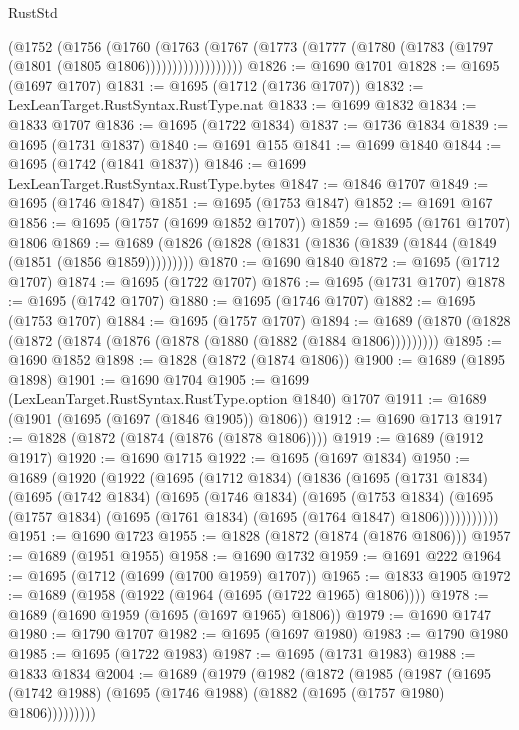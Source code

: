 \begin{lexlean}{RustStd}
\begin{coremodule}
{\begin{coremodule}
{{{{{{{{{{{{{{{{                (@1752
                  (@1756
                    (@1760
                      (@1763
                        (@1767
                          (@1773 (@1777 (@1780 (@1783 (@1797 (@1801 (@1805 @1806))))))))))))))))))
@1826 := @1690 @1701
@1828 := @1695 (@1697 @1707)
@1831 := @1695 (@1712 (@1736 @1707))
@1832 := LexLeanTarget.RustSyntax.RustType.nat
@1833 := @1699 @1832
@1834 := @1833 @1707
@1836 := @1695 (@1722 @1834)
@1837 := @1736 @1834
@1839 := @1695 (@1731 @1837)
@1840 := @1691 @155
@1841 := @1699 @1840
@1844 := @1695 (@1742 (@1841 @1837))
@1846 := @1699 LexLeanTarget.RustSyntax.RustType.bytes
@1847 := @1846 @1707
@1849 := @1695 (@1746 @1847)
@1851 := @1695 (@1753 @1847)
@1852 := @1691 @167
@1856 := @1695 (@1757 (@1699 @1852 @1707))
@1859 := @1695 (@1761 @1707) @1806
@1869 := @1689 (@1826 (@1828 (@1831 (@1836 (@1839 (@1844 (@1849 (@1851 (@1856 @1859)))))))))
@1870 := @1690 @1840
@1872 := @1695 (@1712 @1707)
@1874 := @1695 (@1722 @1707)
@1876 := @1695 (@1731 @1707)
@1878 := @1695 (@1742 @1707)
@1880 := @1695 (@1746 @1707)
@1882 := @1695 (@1753 @1707)
@1884 := @1695 (@1757 @1707)
@1894 := @1689 (@1870 (@1828 (@1872 (@1874 (@1876 (@1878 (@1880 (@1882 (@1884 @1806)))))))))
@1895 := @1690 @1852
@1898 := @1828 (@1872 (@1874 @1806))
@1900 := @1689 (@1895 @1898)
@1901 := @1690 @1704
@1905 := @1699 (LexLeanTarget.RustSyntax.RustType.option @1840) @1707
@1911 := @1689 (@1901 (@1695 (@1697 (@1846 @1905)) @1806))
@1912 := @1690 @1713
@1917 := @1828 (@1872 (@1874 (@1876 (@1878 @1806))))
@1919 := @1689 (@1912 @1917)
@1920 := @1690 @1715
@1922 := @1695 (@1697 @1834)
@1950 := @1689
    (@1920
      (@1922
        (@1695
          (@1712 @1834)
          (@1836
            (@1695
              (@1731 @1834)
              (@1695
                (@1742 @1834)
                (@1695
                  (@1746 @1834)
                  (@1695
                    (@1753 @1834)
                    (@1695 (@1757 @1834) (@1695 (@1761 @1834) (@1695 (@1764 @1847) @1806)))))))))))
@1951 := @1690 @1723
@1955 := @1828 (@1872 (@1874 (@1876 @1806)))
@1957 := @1689 (@1951 @1955)
@1958 := @1690 @1732
@1959 := @1691 @222
@1964 := @1695 (@1712 (@1699 (@1700 @1959) @1707))
@1965 := @1833 @1905
@1972 := @1689 (@1958 (@1922 (@1964 (@1695 (@1722 @1965) @1806))))
@1978 := @1689 (@1690 @1959 (@1695 (@1697 @1965) @1806))
@1979 := @1690 @1747
@1980 := @1790 @1707
@1982 := @1695 (@1697 @1980)
@1983 := @1790 @1980
@1985 := @1695 (@1722 @1983)
@1987 := @1695 (@1731 @1983)
@1988 := @1833 @1834
@2004 := @1689
    (@1979
      (@1982
        (@1872
          (@1985
            (@1987
              (@1695 (@1742 @1988) (@1695 (@1746 @1988) (@1882 (@1695 (@1757 @1980) @1806)))))))))
}}}}}}}}}}}}}}}}
\end{coremodule}}
\end{coremodule}
\end{lexlean}
